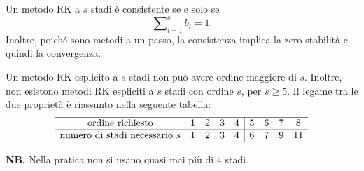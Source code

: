 \begin{theorem}
Un metodo RK a $s$ stadi è consistente se e solo se
$$\sum\nolimits ^{s}_{i=1} b_{i} =1.$$
Inoltre, poiché sono metodi a un passo, la consistenza implica la zero-stabilità e quindi la convergenza.
\label{thm:metodo-rk-consistente}
\end{theorem}

\begin{theorem}
Un metodo RK esplicito a $s$ stadi non può avere ordine maggiore di $s$. Inoltre, non esistono metodi RK espliciti a $s$ stadi con ordine $s$, per $s\geqslant 5$.
Il legame tra le due proprietà è riassunto nella seguente tabella:
\begin{equation*}
\begin{array}{ c c c c c|c c c c }
\hline
\text{ordine richiesto} & 1 & 2 & 3 & 4 & 5 & 6 & 7 & 8\\
\hline
\text{numero di stadi necessario} \ s & 1 & 2 & 3 & 4 & 6 & 7 & 9 & 11\\
\hline
\end{array}
\end{equation*}
\end{theorem}

\textbf{NB.} Nella pratica non si usano quasi mai più di $4$ stadi.

